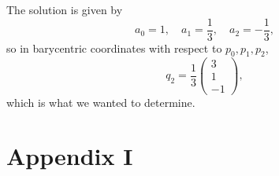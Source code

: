 \documentclass[]{article}
\begin{document}
The solution is given by \begin{equation*}
a_0 = 1, \quad a_1 = \frac{1}{3}, \quad a_2 = -\frac{1}{3},
\end{equation*}
so in barycentric coordinates with respect to $p_0, p_1, p_2$, \begin{equation*}
q_2 = \frac{1}{3}\left(\begin{array}{r}
3\\
1\\
-1
\end{array}\right),
\end{equation*}
which is what we wanted to determine.


\newpage
\section*{Appendix I}
%
\end{document}
